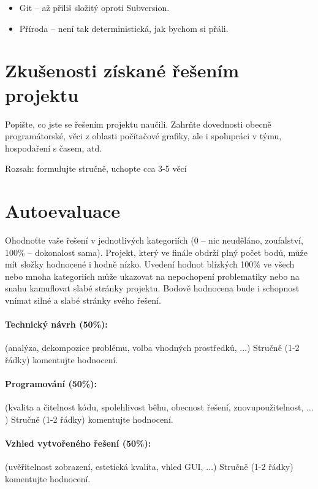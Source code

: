 \documentclass[11pt,a4paper]{article}
\begin{document}
\begin{itemize}
\item Git -- až přiliš složitý oproti Subversion.
\item Příroda -- není tak deterministická, jak bychom si přáli.
\end{itemize}

\section{Zkušenosti získané řešením projektu}

Popište, co jste se řešením projektu naučili. Zahrňte dovednosti obecně
programátorské, věci z oblasti počítačové grafiky, ale i spolupráci v týmu,
hospodaření s časem, atd.

Rozsah: formulujte stručně, uchopte cca 3-5 věcí

\section{Autoevaluace}

Ohodnoťte vaše řešení v jednotlivých kategoriích (0 – nic neuděláno,
zoufalství, 100\% – dokonalost sama). Projekt, který ve finále obdrží plný
počet bodů, může mít složky hodnocené i hodně nízko. Uvedení hodnot blízkých
100\% ve všech nebo mnoha kategoriích může ukazovat na nepochopení problematiky
nebo na snahu kamuflovat slabé stránky projektu. Bodově hodnocena bude i
schopnost vnímat silné a slabé stránky svého řešení.

\paragraph{Technický návrh (50\%):} (analýza, dekompozice problému, volba
vhodných prostředků, $\ldots$) 
Stručně (1-2 řádky) komentujte hodnocení. 

\paragraph{Programování (50\%):} (kvalita a čitelnost kódu, spolehlivost běhu,
obecnost řešení, znovupoužitelnost, $\ldots$)
Stručně (1-2 řádky) komentujte hodnocení. 

\paragraph{Vzhled vytvořeného řešení (50\%):} (uvěřitelnost zobrazení,
estetická kvalita, vhled GUI, $\ldots$)
Stručně (1-2 řádky) komentujte hodnocení. 
\end{document}

